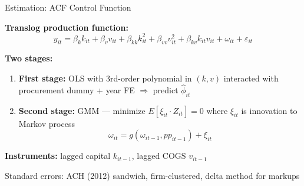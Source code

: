 \documentclass[aspectratio=169,11pt]{beamer}
\begin{document}
\begin{frame}{Estimation: ACF Control Function}

\textbf{Translog production function:}
\begin{equation*}
    y_{it} = \beta_k k_{it} + \beta_v v_{it} + \beta_{kk} k_{it}^2 + \beta_{vv} v_{it}^2 + \beta_{kv} k_{it} v_{it} + \omega_{it} + \varepsilon_{it}
\end{equation*}

\textbf{Two stages:}
\begin{enumerate}
    \item \textbf{First stage:} OLS with 3rd-order polynomial in $(k, v)$ interacted with procurement dummy + year FE $\Rightarrow$ predict $\hat{\phi}_{it}$
    \item \textbf{Second stage:} GMM --- minimize $E[\xi_{it} \cdot Z_{it}] = 0$ where $\xi_{it}$ is innovation to Markov process
    \begin{equation*}
        \omega_{it} = g(\omega_{it-1}, pp_{it-1}) + \xi_{it}
    \end{equation*}
\end{enumerate}

\medskip

\textbf{Instruments:} lagged capital $k_{it-1}$, lagged COGS $v_{it-1}$

\medskip

Standard errors: ACH (2012) sandwich, firm-clustered, delta method for markups

\end{frame}
\end{document}
